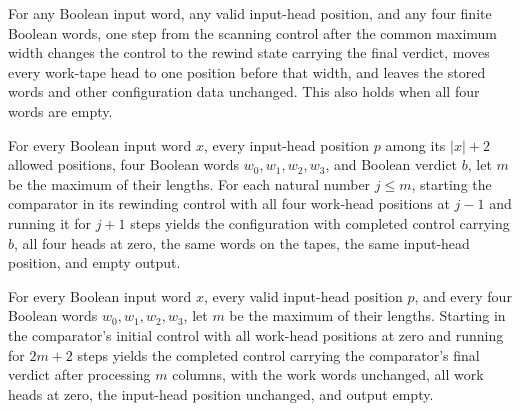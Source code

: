 \begin{lemma}
\label{Complexity.clCmp_finish_scan}
\leanok
{}
For any Boolean input word, any valid input-head position, and any four finite Boolean
words, one step from the scanning control after the common maximum width changes the
control to the rewind state carrying the final verdict, moves every work-tape head to
one position before that width, and leaves the stored words and other configuration data
unchanged. This also holds when all four words are empty.
\end{lemma}

\begin{lemma}
\label{Complexity.clCmp_rewind}
\leanok
{}
For every Boolean input word $x$, every input-head position $p$ among its $|x|+2$
allowed positions, four Boolean words $w_0,w_1,w_2,w_3$, and Boolean verdict $b$, let
$m$ be the maximum of their lengths. For each natural number $j\le m$, starting the
comparator in its rewinding control with all four work-head positions at $j-1$ and
running it for $j+1$ steps yields the configuration with completed control carrying $b$,
all four heads at zero, the same words on the tapes, the same input-head position, and
empty output.
\end{lemma}

\begin{lemma}
\label{Complexity.clCmp_run}
\leanok
{}
For every Boolean input word $x$, every valid input-head position $p$, and every four
Boolean words $w_0,w_1,w_2,w_3$, let $m$ be the maximum of their lengths. Starting in
the comparator's initial control with all work-head positions at zero and running for
$2m+2$ steps yields the completed control carrying the comparator's final verdict after
processing $m$ columns, with the work words unchanged, all work heads at zero, the
input-head position unchanged, and output empty.
\end{lemma}

